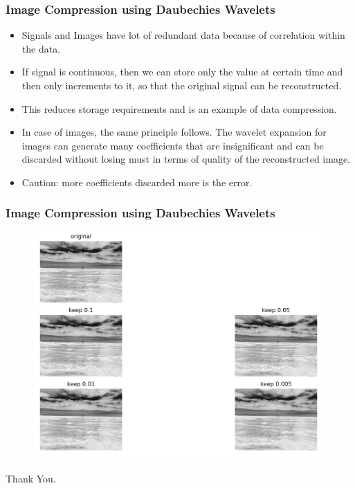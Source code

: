 \documentclass{beamer}
\begin{document}
\begin{frame}
\frametitle{Image Compression using Daubechies Wavelets}

\begin{itemize}
    \item Signals and Images have lot of redundant data because of correlation within the data.
    \item If signal is continuous, then we can store only the value at certain time and then only increments to it, so that the original signal can be reconstructed.
    \item This reduces storage requirements and is an example of data compression.
    \item In case of images, the same principle follows. The wavelet expansion for images can generate many coefficients that are insignificant and can be discarded without losing must in terms of quality of the reconstructed image.
    \item Caution: more coefficients discarded more is the error.
\end{itemize}
\end{frame}


\begin{frame}
    \frametitle{Image Compression using Daubechies Wavelets}
    \begin{figure}
        \includegraphics[width=0.8\linewidth]{image.jpg}
    \end{figure}
    \end{frame}
    


\begin{frame}
\Huge{\centerline{Thank You.}}
\end{frame}

\end{document}
